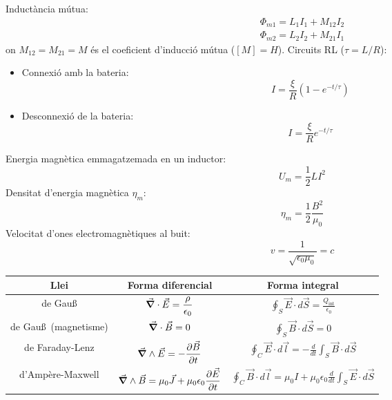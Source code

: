 \documentclass[../../../main.tex]{subfiles}
\begin{document}
\begin{multicols}{2}
    Inductància mútua:
    \begin{gather*}
        \Phi_{m1}=L_1I_1+M_{12}I_2\\
        \Phi_{m2}=L_2I_2+M_{21}I_1
    \end{gather*}
    {on $M_{12}=M_{21}=M$ és el coeficient d'inducció mútua ($[M]=H$).}\newline
    Circuits RL ($\tau=L/R$):
    \begin{itemize}
        \item Connexió amb la bateria: $$I=\frac{\xi}{R}(1-e^{-t/\tau})$$
        \item Desconnexió de la bateria: $$I=\frac{\xi}{R}e^{-t/\tau}$$
    \end{itemize}
    Energia magnètica emmagatzemada en un inductor: $$U_m=\frac{1}{2}LI^2$$
    Densitat d'energia magnètica $\eta_m$: $$\eta_m=\frac{1}{2}\frac{B^2}{\mu_0}$$
    Velocitat d'ones electromagnètiques al buit: $$v=\frac{1}{\sqrt{\epsilon_0\mu_0}}=c$$
\end{multicols}
\begin{table}[ht]
    \centering
    \renewcommand{\arraystretch}{3}
    \begin{tabular}{|c|c|c|}
        \hline
        \bfseries Llei          & \bfseries Forma diferencial                                                                             & \bfseries Forma integral                                                                                    \\
        \hline
        de Gau\ss               & $\displaystyle \Vec{\grad}\cdot\Vec{E}=\frac{\rho}{\epsilon_0}$                                         & $\displaystyle \oint_S\Vec{E}\cdot d\Vec{S}=\frac{Q_{\text{int}}}{\epsilon_0}$                              \\
        \hline
        de Gau\ss\ (magnetisme) & $\displaystyle \Vec{\grad}\cdot\Vec{B}=0$                                                               & $\displaystyle \oint_S\Vec{B}\cdot d\Vec{S}=0$                                                              \\
        \hline
        de Faraday-Lenz         & $\displaystyle \Vec{\grad}\wedge\Vec{E}=-\frac{\partial\Vec{B}}{\partial t}$                            & $\displaystyle \oint_C\Vec{E}\cdot d\Vec{l}=-\frac{d}{dt}\int_S\Vec{B}\cdot d\Vec{S}$                       \\
        \hline
        d'Ampère-Maxwell        & $\displaystyle \Vec{\grad}\wedge\Vec{B}=\mu_0\Vec{J}+\mu_0\epsilon_0\frac{\partial\Vec{E}}{\partial t}$ & $\displaystyle \oint_C\Vec{B}\cdot d\Vec{l}=\mu_0 I+\mu_0\epsilon_0\frac{d}{dt}\int_S\Vec{E}\cdot d\Vec{S}$ \\
        \hline
    \end{tabular}
    \label{tab:my_label}
\end{table}
\end{document}
